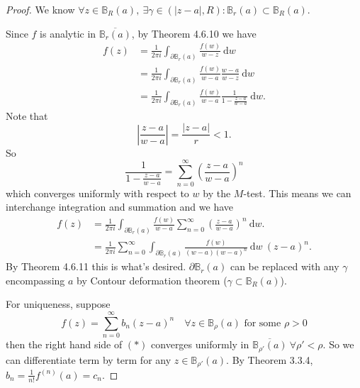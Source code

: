 \documentclass[a4paper]{article}
\theoremstyle{definition}
\begin{document}
\begin{proof}
We know $\forall z\in \mathbb B_R(a),\ \exists \gamma \in (|z-a|,R):\mathbb B_r(a) \subset \mathbb B_R(a)$.
\begin{center}
\end{center}

Since $f$ is analytic in $\overline{\mathbb B_r(a)}$, by Theorem 4.6.10 we have
\[
\begin{aligned}
f(z) &= \frac{1}{2\pi i} \int_{\partial \mathbb B_r(a)} \frac{f(w)}{w-z} \ \mathrm d w\\
&= \frac{1}{2\pi i} \int_{\partial \mathbb B_r(a)} \frac{f(w)}{w-a} \frac{w-a}{w-z} \ \mathrm d w \\
&=\frac{1}{2\pi i} \int_{\partial \mathbb B_r(a)} \frac{f(w)}{w-a} \frac{1}{1-\frac{z-a}{w-a}} \ \mathrm d w.
\end{aligned}
\]
Note that
\[
\left| \frac{z-a}{w-a} \right| = \frac{|z-a|}{r} <1.
\]
So
\[
\frac{1}{1-\frac{z-a}{w-a}} = \sum_{n=0}^\infty \left( \frac{z-a}{w-a}\right)^n
\]
which converges uniformly with respect to $w$ by the $M$-test. This means we can interchange integration and summation and we have
\[
\begin{aligned}
f(z) &= \frac{1}{2\pi i} \int_{\partial \mathbb B_r(a)} \frac{f(w)}{w-a} \sum_{n=0}^\infty \left( \frac{z-a}{w-a}\right)^n \ \mathrm d w. \\
&= \frac{1}{2\pi i} \sum_{n=0}^\infty \int_{\partial \mathbb B_r(a)} \frac{f(w)}{(w-a)(w-a)^n}\ \mathrm d w \ (z-a)^n.
\end{aligned}
\]
By Theorem 4.6.11 this is what's desired. $\partial \mathbb B_r(a)$ can be replaced with any $\gamma$ encompassing $a$ by Contour deformation theorem ($\gamma \subset \mathbb B_R(a)$).

For uniqueness, suppose
\[
f(z) = \sum_{n=0}^\infty b_n (z-a)^n \quad \forall z\in \mathbb B_{\rho}(a) \text{ for some }\rho>0
\tag{$\ast$}
\]
then the right hand side of $(\ast)$ converges uniformly in $\overline{\mathbb B_{\rho'} (a)} \ \forall \rho '<\rho$. So we can differentiate term by term for any $z\in \mathbb B_{\rho'} (a)$. By Theorem 3.3.4, $b_n=\frac{1}{n!} f^{(n)}(a)=c_n$.
\end{proof}
\end{document}
